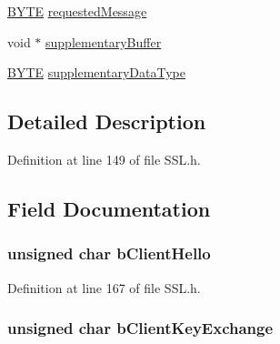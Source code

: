 \begin{DoxyCompactItemize}
\begin{tabbing}
\end{tabbing}\item 
\hyperlink{_generic_type_defs_8h_a4ae1dab0fb4b072a66584546209e7d58}{B\+Y\+T\+E} \hyperlink{struct_s_s_l___s_t_u_b_a7ae5fc46c7f35924146979124a0f2652}{requested\+Message}
\item 
void $\ast$ \hyperlink{struct_s_s_l___s_t_u_b_a87143651e8087048a69a7908349f98c0}{supplementary\+Buffer}
\item 
\hyperlink{_generic_type_defs_8h_a4ae1dab0fb4b072a66584546209e7d58}{B\+Y\+T\+E} \hyperlink{struct_s_s_l___s_t_u_b_a3d3afa10792ace10cb49844f1cc990f9}{supplementary\+Data\+Type}
\end{DoxyCompactItemize}


\subsection{Detailed Description}


Definition at line 149 of file S\+S\+L.\+h.



\subsection{Field Documentation}
\hypertarget{struct_s_s_l___s_t_u_b_a2e5ed7e5fb7dd6b9044deafa95d71968}{}
\subsubsection[{b\+Client\+Hello}]{\setlength{\rightskip}{0pt plus 5cm}unsigned char b\+Client\+Hello}\label{struct_s_s_l___s_t_u_b_a2e5ed7e5fb7dd6b9044deafa95d71968}


Definition at line 167 of file S\+S\+L.\+h.

\hypertarget{struct_s_s_l___s_t_u_b_abc654a2926d7dd7147a7925377c0cf71}{}
\subsubsection[{b\+Client\+Key\+Exchange}]{\setlength{\rightskip}{0pt plus 5cm}unsigned char b\+Client\+Key\+Exchange}\label{struct_s_s_l___s_t_u_b_abc654a2926d7dd7147a7925377c0cf71}


